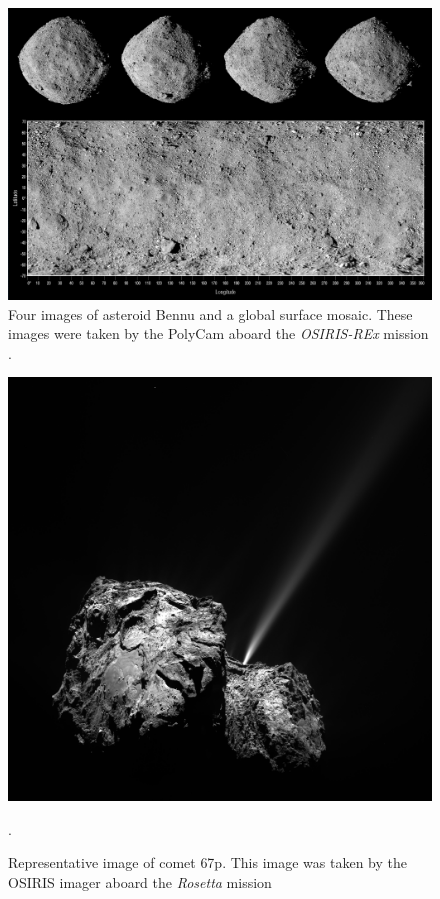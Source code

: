 \begin{figure}[htb]
    \centering
    \includegraphics[width=.8\textwidth]{doc/thesis/0_figures/procedural_terrain/2963_Bennu.png}
    \caption{Four images of asteroid Bennu and a global surface mosaic. These images were taken by the PolyCam aboard the \textit{OSIRIS-REx} mission \cite{FourExploration}.}
    \label{fig:render_quali_bennu}
\end{figure}

\begin{figure}[htb]
    \centering
    \includegraphics[width=.8\textwidth]{doc/thesis/0_figures/procedural_terrain/67P_CG.PNG}
    \caption{Representative image of comet \acrlong{67p}. This image was taken by the OSIRIS imager aboard the \textit{Rosetta} mission \cite{OSIRISArchiveb}}.
    \label{fig:render_quali_67p}
\end{figure}

